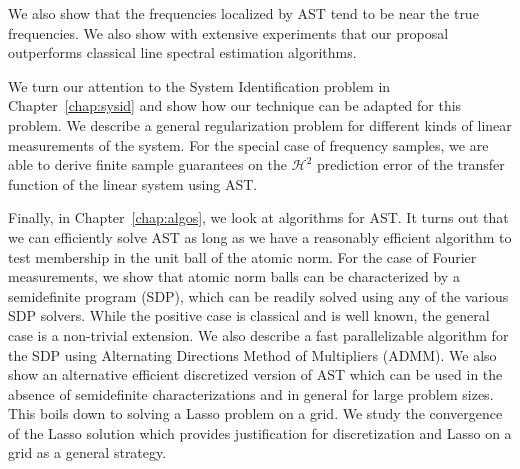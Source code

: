 We also show that the frequencies localized by AST tend to be near the true
frequencies. We also show with extensive experiments that our proposal
outperforms classical line spectral estimation algorithms.

We turn our attention to the System Identification problem in
Chapter~\ref{chap:sysid} and show how our technique can be adapted for this
problem. We describe a general regularization problem for different kinds of
linear measurements of the system. For the special case of frequency samples, we
are able to derive finite sample guarantees on the $\mathcal{H}^2$ prediction
error of the transfer function of the linear system using AST.

Finally, in Chapter~\ref{chap:algos}, we look at algorithms for AST. It turns
out that we can efficiently solve AST as long as we have a reasonably efficient
algorithm to test membership in the unit ball of the atomic norm. For the case
of Fourier measurements, we show that atomic norm balls can be characterized by
a semidefinite program (SDP), which can be readily solved using any of the
various SDP solvers. While the positive case is classical and is well known, the
general case is a non-trivial extension. We also describe a fast parallelizable
algorithm for the SDP using Alternating Directions Method of Multipliers (ADMM).
We also show an alternative efficient discretized version of AST which can be
used in the absence of semidefinite characterizations and in general for large
problem sizes. This boils down to solving a Lasso problem on a grid. We study
the convergence of the Lasso solution which provides justification for
discretization and Lasso on a grid as a general strategy.

